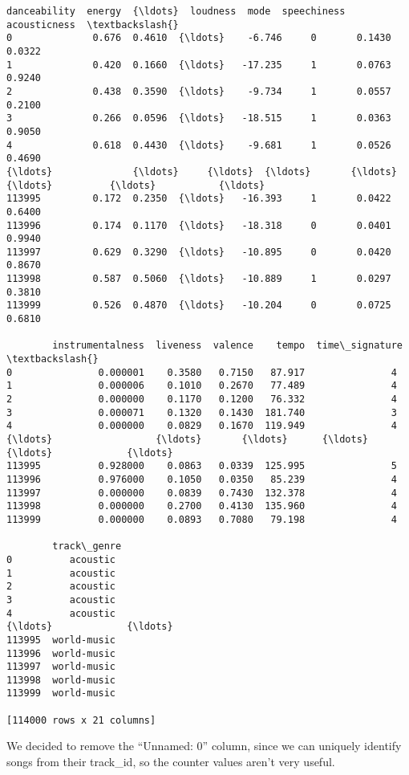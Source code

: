 \documentclass[11pt]{article}
\begin{document}
\begin{tcolorbox}[breakable, size=fbox, boxrule=.5pt, pad at break*=1mm, opacityfill=0]
\begin{Verbatim}[commandchars=\\\{\}]
        danceability  energy  {\ldots}  loudness  mode  speechiness  acousticness  \textbackslash{}
0              0.676  0.4610  {\ldots}    -6.746     0       0.1430        0.0322
1              0.420  0.1660  {\ldots}   -17.235     1       0.0763        0.9240
2              0.438  0.3590  {\ldots}    -9.734     1       0.0557        0.2100
3              0.266  0.0596  {\ldots}   -18.515     1       0.0363        0.9050
4              0.618  0.4430  {\ldots}    -9.681     1       0.0526        0.4690
{\ldots}              {\ldots}     {\ldots}  {\ldots}       {\ldots}   {\ldots}          {\ldots}           {\ldots}
113995         0.172  0.2350  {\ldots}   -16.393     1       0.0422        0.6400
113996         0.174  0.1170  {\ldots}   -18.318     0       0.0401        0.9940
113997         0.629  0.3290  {\ldots}   -10.895     0       0.0420        0.8670
113998         0.587  0.5060  {\ldots}   -10.889     1       0.0297        0.3810
113999         0.526  0.4870  {\ldots}   -10.204     0       0.0725        0.6810

        instrumentalness  liveness  valence    tempo  time\_signature  \textbackslash{}
0               0.000001    0.3580   0.7150   87.917               4
1               0.000006    0.1010   0.2670   77.489               4
2               0.000000    0.1170   0.1200   76.332               4
3               0.000071    0.1320   0.1430  181.740               3
4               0.000000    0.0829   0.1670  119.949               4
{\ldots}                  {\ldots}       {\ldots}      {\ldots}      {\ldots}             {\ldots}
113995          0.928000    0.0863   0.0339  125.995               5
113996          0.976000    0.1050   0.0350   85.239               4
113997          0.000000    0.0839   0.7430  132.378               4
113998          0.000000    0.2700   0.4130  135.960               4
113999          0.000000    0.0893   0.7080   79.198               4

        track\_genre
0          acoustic
1          acoustic
2          acoustic
3          acoustic
4          acoustic
{\ldots}             {\ldots}
113995  world-music
113996  world-music
113997  world-music
113998  world-music
113999  world-music

[114000 rows x 21 columns]
\end{Verbatim}
\end{tcolorbox}
        
    We decided to remove the ``Unnamed: 0'' column, since we can uniquely
identify songs from their track\_id, so the counter values aren't very
useful.
\end{document}
